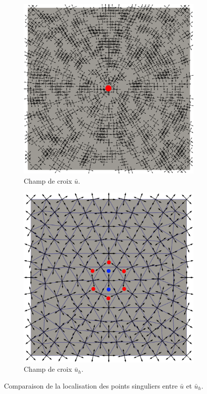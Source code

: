 \begin{figure}[htpb]
\centering
\begin{subfigure}[b]{0.495\textwidth}
    \centering
    \includegraphics[width=\textwidth]{images/u_sing.pdf}
    \caption{Champ de croix $\bar{u}$.}
\end{subfigure}
\hfill
\begin{subfigure}[b]{0.495\textwidth}
    \centering
    \includegraphics[width=\textwidth]{images/u_h_sing.pdf}
    \caption{Champ de croix $\bar{u}_h$.}
\end{subfigure}
  \caption{Comparaison de la localisation des points singuliers entre $\bar{u}$ et $\bar{u}_h$.}
  \label{fig:eclatement_point_sing}
\end{figure}

